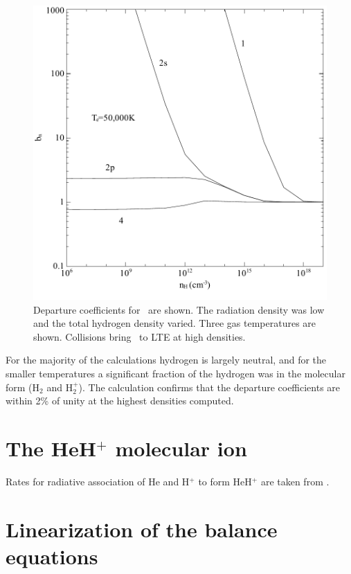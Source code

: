 \begin{figure}
\centering
\includegraphics[scale=0.8]{Hmi_vs_density}
\caption[\hminus\ departure coefficients vs density]{Departure coefficients for \hminus\ are shown. The radiation density
was low and the total hydrogen density varied.  Three gas temperatures are
shown.  Collisions bring \hminus\ to LTE at high densities.}
\label{fig:Hmi_vs_density}
\end{figure}

For the majority of the calculations hydrogen is largely neutral, and
for the smaller temperatures a significant fraction of the hydrogen was
in the molecular form (H$_2$ and H$_2^+$).  The calculation confirms that the
departure coefficients are within 2\% of unity at the highest densities
computed.

\section{The HeH$^+$ molecular ion }

Rates for radiative association of He and H$^+$ to form HeH$^+$ are taken from \citet{Zygelman1990}.

\section{Linearization of the balance equations}

